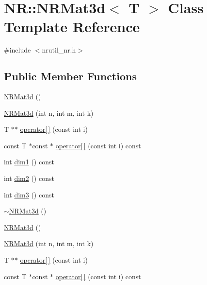\hypertarget{classNR_1_1NRMat3d}{}\section{NR\+:\+:N\+R\+Mat3d$<$ T $>$ Class Template Reference}
\label{classNR_1_1NRMat3d}


{\ttfamily \#include $<$nrutil\+\_\+nr.\+h$>$}

\subsection*{Public Member Functions}
\begin{DoxyCompactItemize}
\item 
\mbox{\hyperlink{classNR_1_1NRMat3d_a92498ec487349e85209cfad66e6b7d4e}{N\+R\+Mat3d}} ()
\item 
\mbox{\hyperlink{classNR_1_1NRMat3d_a72437875f6affe5898dee887c3ebfe4c}{N\+R\+Mat3d}} (int n, int m, int k)
\item 
T $\ast$$\ast$ \mbox{\hyperlink{classNR_1_1NRMat3d_a2a302c22836b7c9872fb837f7c6a64c1}{operator\mbox{[}$\,$\mbox{]}}} (const int i)
\item 
const T $\ast$const  $\ast$ \mbox{\hyperlink{classNR_1_1NRMat3d_a93f8b186294e7a585b46a1bf3c5028cc}{operator\mbox{[}$\,$\mbox{]}}} (const int i) const
\item 
int \mbox{\hyperlink{classNR_1_1NRMat3d_ae46651c069e6954e03e5d3a39ffd2891}{dim1}} () const
\item 
int \mbox{\hyperlink{classNR_1_1NRMat3d_a8c287b30748a7fdfc3f4424e26f88252}{dim2}} () const
\item 
int \mbox{\hyperlink{classNR_1_1NRMat3d_aec8af45aa2025ea53f2967a79d0fe233}{dim3}} () const
\item 
\mbox{\hyperlink{classNR_1_1NRMat3d_a6c8dc36e24e162855f99ccfbc380ff52}{$\sim$\+N\+R\+Mat3d}} ()
\item 
\mbox{\hyperlink{classNR_1_1NRMat3d_a92498ec487349e85209cfad66e6b7d4e}{N\+R\+Mat3d}} ()
\item 
\mbox{\hyperlink{classNR_1_1NRMat3d_a72437875f6affe5898dee887c3ebfe4c}{N\+R\+Mat3d}} (int n, int m, int k)
\item 
T $\ast$$\ast$ \mbox{\hyperlink{classNR_1_1NRMat3d_a24920cbac3d063139022a4aafee24e4a}{operator\mbox{[}$\,$\mbox{]}}} (const int i)
\item 
const T $\ast$const  $\ast$ \mbox{\hyperlink{classNR_1_1NRMat3d_a17f8d263fbe8876a2219cc1a4bdac0ca}{operator\mbox{[}$\,$\mbox{]}}} (const int i) const

\end{DoxyCompactItemize}

